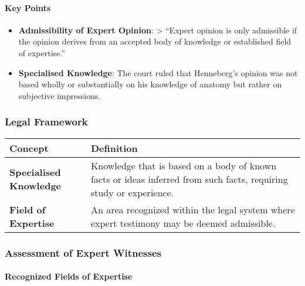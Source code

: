 \paragraph{Key Points}\label{key-points-3}

\begin{itemize}
\item
  \textbf{Admissibility of Expert Opinion}: \textgreater{} ``Expert
  opinion is only admissible if the opinion derives from an accepted
  body of knowledge or established field of expertise.''
\item
  \textbf{Specialised Knowledge}: The court ruled that Henneberg's
  opinion was not based wholly or substantially on his knowledge of
  anatomy but rather on subjective impressions.
\end{itemize}

\subsubsection{Legal Framework}\label{legal-framework}

\begin{longtable}[]{@{}
  >{\raggedright\arraybackslash}p{}
  >{\raggedright\arraybackslash}p{}@{}}
\toprule\noalign{}
\begin{minipage}[b]{\linewidth}\raggedright
\textbf{Concept}
\end{minipage} & \begin{minipage}[b]{\linewidth}\raggedright
\textbf{Definition}
\end{minipage} \\
\midrule\noalign{}
\endhead
\bottomrule\noalign{}
\endlastfoot
\textbf{Specialised Knowledge} & Knowledge that is based on a body of
known facts or ideas inferred from such facts, requiring study or
experience. \\
\textbf{Field of Expertise} & An area recognized within the legal system
where expert testimony may be deemed admissible. \\
\end{longtable}

\subsubsection{Assessment of Expert
Witnesses}\label{assessment-of-expert-witnesses}

\paragraph{Recognized Fields of
Expertise}\label{recognized-fields-of-expertise}


